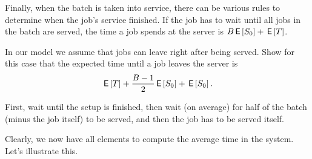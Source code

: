 Finally, when the batch is taken into service, there can be various rules to determine when the job's service finished. If the job has to wait until all jobs in the batch are served, the time a job spends at the server is $B \,\mathsf{E}\left[S_0\right] + \,\mathsf{E}\left[T\right]$. 

\begin{exercise}
In our model we assume that jobs can leave right after being served.  Show for this case that the expected time  until a job leaves the server is
\begin{equation*}
\,\mathsf{E}\left[T\right]  + \frac{B-1}{2}\,\mathsf{E}\left[S_0\right] +\,\mathsf{E}\left[S_0\right].
\end{equation*}
\begin{solution}
  First, wait until the setup is finished,  then wait (on average) for half of the batch (minus the job itself) to be served, and then the job has to be served itself.
\end{solution}
\end{exercise}

Clearly, we now have all elements to compute the average time in the system. Let's illustrate this. 

